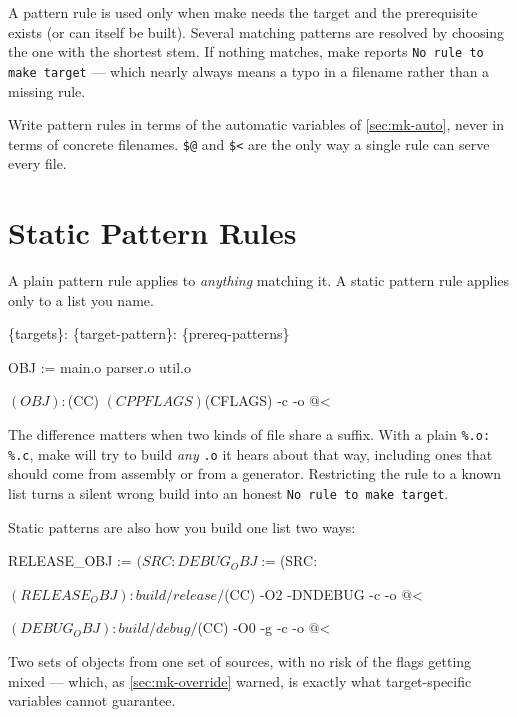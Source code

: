 \begin{note}
	A pattern rule is used only when make needs the target and the prerequisite
	exists (or can itself be built). Several matching patterns are resolved by
	choosing the one with the shortest stem. If nothing matches, make reports
	\texttt{No rule to make target} --- which nearly always means a typo in a
	filename rather than a missing rule.
\end{note}

\begin{moral}
	Write pattern rules in terms of the automatic variables of
	\autoref{sec:mk-auto}, never in terms of concrete filenames. \texttt{\$@} and
	\texttt{\$<} are the only way a single rule can serve every file.
\end{moral}

\section{Static Pattern Rules}\label{sec:mk-static}

A plain pattern rule applies to \emph{anything} matching it. A static pattern
rule applies only to a list you name.

\begin{center}
	\ttfamily\large
	\{targets\}: \{target-pattern\}: \{prereq-patterns\}
\end{center}

\begin{makecode}
OBJ := main.o parser.o util.o

$(OBJ): %
    $(CC) $(CPPFLAGS) $(CFLAGS) -c -o $@ $<
\end{makecode}

\begin{note}
	The difference matters when two kinds of file share a suffix. With a plain
	\texttt{\%.o: \%.c}, make will try to build \emph{any} \texttt{.o} it hears
	about that way, including ones that should come from assembly or from a
	generator. Restricting the rule to a known list turns a silent wrong build into
	an honest \texttt{No rule to make target}.
\end{note}

\begin{eg}
	Static patterns are also how you build one list two ways:
\begin{makecode}
RELEASE_OBJ := $(SRC:%
DEBUG_OBJ   := $(SRC:%

$(RELEASE_OBJ): build/release/%
    $(CC) -O2 -DNDEBUG -c -o $@ $<

$(DEBUG_OBJ): build/debug/%
    $(CC) -O0 -g -c -o $@ $<
\end{makecode}
	Two sets of objects from one set of sources, with no risk of the flags getting
	mixed --- which, as \autoref{sec:mk-override} warned, is exactly what
	target-specific variables cannot guarantee.
\end{eg}

